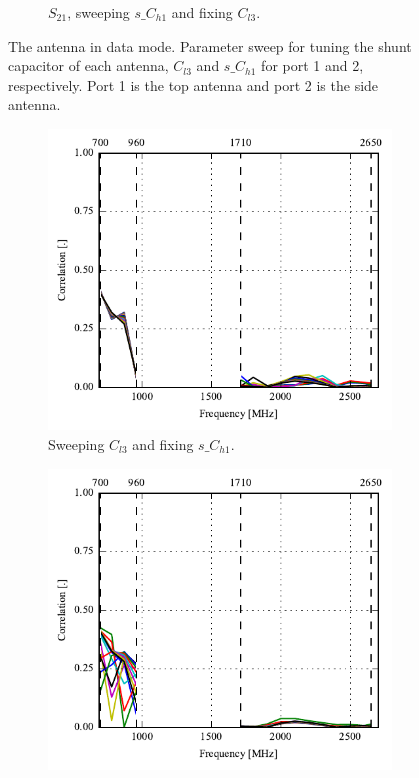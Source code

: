 \begin{figure}[htbp]
\begin{subfigure}[b]{0.49\linewidth}
        \caption{$S_{21}$, sweeping $s\_C_{h1}$ and fixing $C_{l3}$.}
    \end{subfigure}
    \caption{The antenna in data mode. Parameter sweep for tuning the shunt capacitor of each antenna, $C_{l3}$ and $s\_C_{h1}$ for port 1 and 2, respectively. Port 1 is the top antenna and port 2 is the side antenna.}
    \label{fig:ant3_sparam_sweep_data}
\end{figure}

\begin{figure}[htbp]
    \centering
    \begin{subfigure}{0.49\linewidth}
        \includegraphics{img/tech_sol/nonresonant/simulation/data_mode/sweep_top_corr}
        \caption{Sweeping $C_{l3}$ and fixing $s\_C_{h1}$.}
    \end{subfigure}
    \hfill
    \begin{subfigure}{0.49\linewidth}
        \includegraphics{img/tech_sol/nonresonant/simulation/data_mode/sweep_side_corr}

\end{subfigure}
\end{figure}
